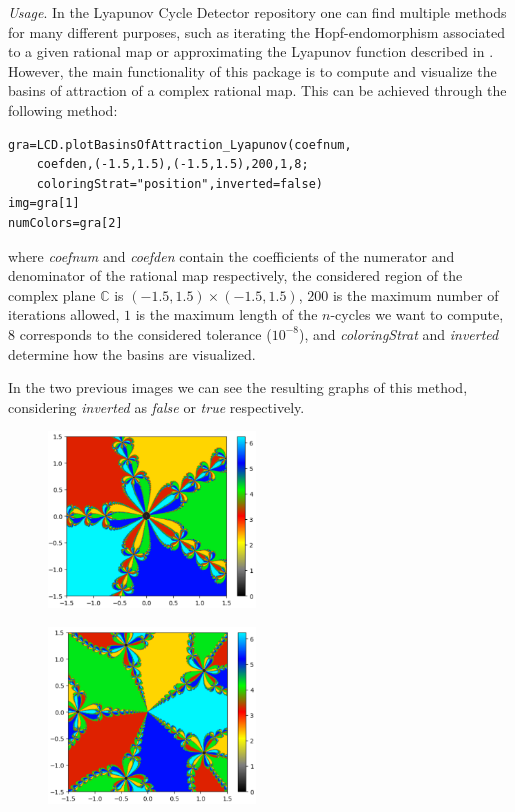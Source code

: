 \documentclass{juliacon}
\begin{document}
\textit{Usage}. In the Lyapunov Cycle Detector repository one can find multiple methods for many different purposes, such as iterating the Hopf-endomorphism associated to a given rational map or approximating the Lyapunov function described in \cite{preprint}. However, the main functionality of this package is to compute and visualize the basins of attraction of a complex rational map. This can be achieved through the following method:
\begin{verbatim}
gra=LCD.plotBasinsOfAttraction_Lyapunov(coefnum,
    coefden,(-1.5,1.5),(-1.5,1.5),200,1,8;
    coloringStrat="position",inverted=false)
img=gra[1]
numColors=gra[2]
\end{verbatim}
where \textit{coefnum} and \textit{coefden} contain the coefficients of the numerator and denominator of the rational map respectively, the considered region of the complex plane $\mathbb{C}$ is $(-1.5,1.5)\times(-1.5,1.5)$, $200$ is the maximum number of iterations allowed, $1$ is the maximum length of the $n$-cycles we want to compute, $8$ corresponds to the considered tolerance ($10^{-8}$), and \textit{coloringStrat} and \textit{inverted} determine how the basins are visualized.

In the two previous images we can see the resulting graphs of this method, considering \textit{inverted} as \textit{false} or \textit{true} respectively.

\begin{figure}
\begin{center}
    \includegraphics[width=5.5cm]{z^5-1_(origin).PNG}
\end{center}
\end{figure}
\begin{figure}
\begin{center}
    \includegraphics[width=5.5cm]{z^5-1_(infinity).PNG}
\end{center}
\end{figure}



\end{document}
